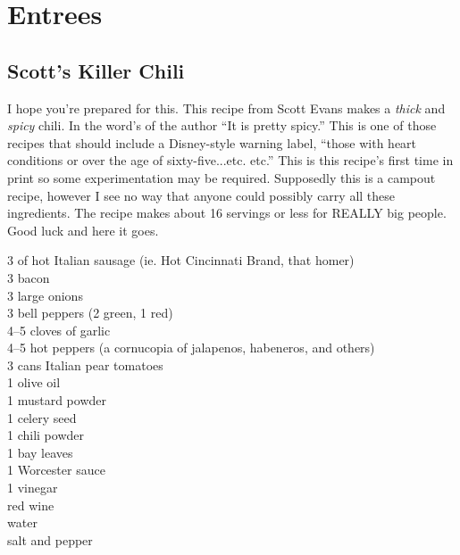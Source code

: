 \chapter{Entrees}

\section{Scott's Killer Chili}

\begin{open}
  I hope you're prepared for this.  This recipe from Scott Evans makes a {\em
  thick} and {\em spicy} chili.  In the word's of the author ``It is pretty
  spicy.''  This is one of those recipes that should include a Disney-style
  warning label, ``\textellipsis those with heart conditions or over the age of
  sixty-five...etc. etc.''  This is this recipe's first time in print so some
  experimentation may be required.  Supposedly this is a campout recipe, however
  I see no way that anyone could possibly carry all these ingredients. The
  recipe makes about 16 servings or less for REALLY big people.  Good luck and
  here it goes.
\end{open}
\begin{ingredients}
  \SI{3}{\pound} of hot Italian sausage (ie. Hot Cincinnati Brand, that homer) \\
  \SI{3}{\pound} bacon \\
  3 large onions \\
  3 bell peppers (2 green, 1 red) \\
  \numrange{4}{5} cloves of garlic \\
  \numrange{4}{5} hot peppers (a cornucopia of jalapenos, habeneros, and others) \\
  3 cans Italian pear tomatoes \\
  \SI{1}{\tblspoon} olive oil \\
  \SI{1}{\tblspoon} mustard powder \\
  \SI{1}{\tblspoon} celery seed \\
  \SI{1}{\tblspoon} chili powder \\
  \SI{1}{\tblspoon} bay leaves \\
  \SI{1}{\tblspoon} Worcester sauce \\
  \SI{1}{\tblspoon} vinegar \\
  red wine \\
  water \\
  salt and pepper
\end{ingredients}
